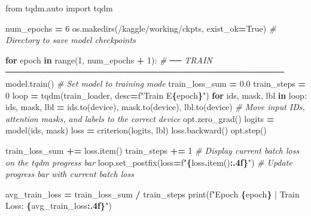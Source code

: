 \documentclass[
]{article}
\newenvironment{Shaded}{\begin{snugshade}}{\end{snugshade}}
\newcommand{\BuiltInTok}[1]{#1}
\newcommand{\CommentTok}[1]{\textcolor[rgb]{0.56,0.35,0.01}{\textit{#1}}}
\newcommand{\ControlFlowTok}[1]{\textcolor[rgb]{0.13,0.29,0.53}{\textbf{#1}}}
\newcommand{\DecValTok}[1]{\textcolor[rgb]{0.00,0.00,0.81}{#1}}
\newcommand{\FloatTok}[1]{\textcolor[rgb]{0.00,0.00,0.81}{#1}}
\newcommand{\ImportTok}[1]{#1}
\newcommand{\KeywordTok}[1]{\textcolor[rgb]{0.13,0.29,0.53}{\textbf{#1}}}
\newcommand{\NormalTok}[1]{#1}
\newcommand{\OperatorTok}[1]{\textcolor[rgb]{0.81,0.36,0.00}{\textbf{#1}}}
\newcommand{\SpecialCharTok}[1]{\textcolor[rgb]{0.81,0.36,0.00}{\textbf{#1}}}
\newcommand{\SpecialStringTok}[1]{\textcolor[rgb]{0.31,0.60,0.02}{#1}}
\newcommand{\StringTok}[1]{\textcolor[rgb]{0.31,0.60,0.02}{#1}}
\newcommand{\VariableTok}[1]{\textcolor[rgb]{0.00,0.00,0.00}{#1}}
\begin{document}
\begin{Shaded}
\begin{Highlighting}[]
\ImportTok{from}\NormalTok{ tqdm.auto }\ImportTok{import}\NormalTok{ tqdm}

\NormalTok{num\_epochs }\OperatorTok{=} \DecValTok{6}
\NormalTok{os.makedirs(}\StringTok{\textquotesingle{}/kaggle/working/ckpts\textquotesingle{}}\NormalTok{, exist\_ok}\OperatorTok{=}\VariableTok{True}\NormalTok{) }\CommentTok{\# Directory to save model checkpoints}


\ControlFlowTok{for}\NormalTok{ epoch }\KeywordTok{in} \BuiltInTok{range}\NormalTok{(}\DecValTok{1}\NormalTok{, num\_epochs }\OperatorTok{+} \DecValTok{1}\NormalTok{):}
    \CommentTok{\# ── TRAIN ───────────────────────────────────────────────}
\NormalTok{    model.train()  }\CommentTok{\# Set model to training mode}
\NormalTok{    train\_loss\_sum }\OperatorTok{=} \FloatTok{0.0}
\NormalTok{    train\_steps    }\OperatorTok{=} \DecValTok{0}
\NormalTok{    loop }\OperatorTok{=}\NormalTok{ tqdm(train\_loader, desc}\OperatorTok{=}\SpecialStringTok{f"Train E}\SpecialCharTok{\{}\NormalTok{epoch}\SpecialCharTok{\}}\SpecialStringTok{"}\NormalTok{)}
    \ControlFlowTok{for}\NormalTok{ ids, mask, lbl }\KeywordTok{in}\NormalTok{ loop: }
\NormalTok{        ids, mask, lbl }\OperatorTok{=}\NormalTok{ ids.to(device), mask.to(device), lbl.to(device)}
        \CommentTok{\# Move input IDs, attention masks, and labels to the correct device}
\NormalTok{        opt.zero\_grad()}
\NormalTok{        logits }\OperatorTok{=}\NormalTok{ model(ids, mask)}
\NormalTok{        loss   }\OperatorTok{=}\NormalTok{ criterion(logits, lbl)}
\NormalTok{        loss.backward()}
\NormalTok{        opt.step()}

\NormalTok{        train\_loss\_sum }\OperatorTok{+=}\NormalTok{ loss.item()}
\NormalTok{        train\_steps    }\OperatorTok{+=} \DecValTok{1}
        \CommentTok{\# Display current batch loss on the tqdm progress bar}
\NormalTok{        loop.set\_postfix(loss}\OperatorTok{=}\SpecialStringTok{f"}\SpecialCharTok{\{}\NormalTok{loss}\SpecialCharTok{.}\NormalTok{item()}\SpecialCharTok{:.4f\}}\SpecialStringTok{"}\NormalTok{)  }\CommentTok{\# Update progress bar with current batch loss}

\NormalTok{    avg\_train\_loss }\OperatorTok{=}\NormalTok{ train\_loss\_sum }\OperatorTok{/}\NormalTok{ train\_steps}
    \BuiltInTok{print}\NormalTok{(}\SpecialStringTok{f"Epoch }\SpecialCharTok{\{}\NormalTok{epoch}\SpecialCharTok{\}}\SpecialStringTok{ | Train Loss: }\SpecialCharTok{\{}\NormalTok{avg\_train\_loss}\SpecialCharTok{:.4f\}}\SpecialStringTok{"}\NormalTok{)}


\end{Highlighting}
\end{Shaded}
\end{document}
